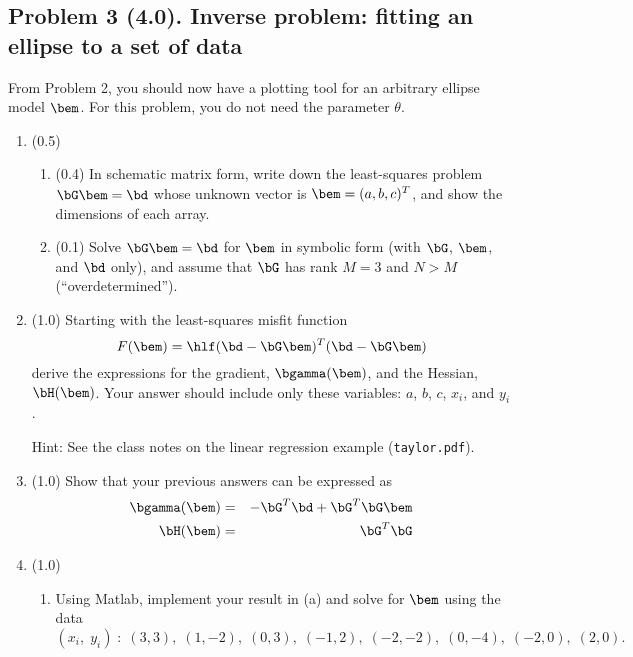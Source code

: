 \documentclass[11pt,titlepage,fleqn]{article}
\begin{document}

\subsection*{Problem 3 (4.0). Inverse problem: fitting an ellipse to a set of data}

From Problem 2, you should now have a plotting tool for an arbitrary ellipse model $\bem$.
For this problem, you do not need the parameter $\theta$.

\begin{enumerate}
\item (0.5) 

\begin{enumerate}
\item  (0.4) In schematic matrix form, write down the least-squares problem $\bG\bem=\bd$ whose unknown vector is $\bem = (a,b,c)^T$, and show the dimensions of each array.

\item (0.1) Solve $\bG\bem=\bd$ for $\bem$ in symbolic form (\ie with $\bG$, $\bem$, and $\bd$ only), and assume that $\bG$ has rank $M = 3$ and $N > M$ (``overdetermined'').
\end{enumerate}


\item (1.0) Starting with the least-squares misfit function
%
\begin{equation}
F(\bem) = \hlf (\bd - \bG\bem)^T(\bd - \bG\bem)
\end{equation}
%
derive the expressions for the gradient, $\bgamma(\bem)$, and the Hessian, $\bH(\bem)$. Your answer should include only these variables: $a$, $b$, $c$, $x_i$, and $y_i$.

Hint: See the class notes on the linear regression example (\verb+taylor.pdf+).


\item (1.0) Show that your previous answers can be expressed as
%
\begin{eqnarray}
\bgamma(\bem) &=& -\bG^T\bd + \bG^T\bG\bem
\\
\bH(\bem) &=& \bG^T\bG
\end{eqnarray}


\item (1.0)
\begin{enumerate}
\item Using Matlab, implement your result in (a) and solve for $\bem$ using the data
%
\begin{equation*}
(x_i,\;y_i) \;:\; (3,3),\;(1,-2),\;(0,3),\;(-1,2),\;(-2,-2),\;(0,-4),\;(-2,0),\;(2,0).
\end{equation*}


\end{enumerate}
\end{enumerate}
\end{document}
